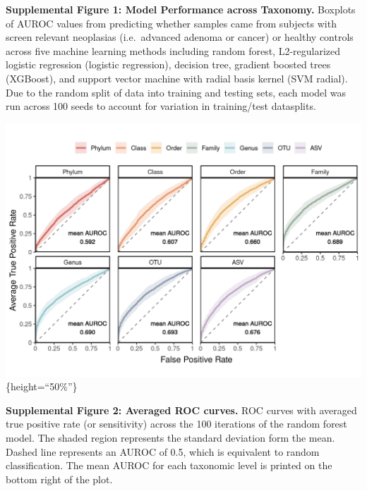 \documentclass[]{article}
\begin{document}
\textbf{Supplemental Figure 1: Model Performance across Taxonomy.}
Boxplots of AUROC values from predicting whether samples came from
subjects with screen relevant neoplasias (i.e.~advanced adenoma or
cancer) or healthy controls across five machine learning methods
including random forest, L2-regularized logistic regression (logistic
regression), decision tree, gradient boosted trees (XGBoost), and
support vector machine with radial basis kernel (SVM radial). Due to the
random split of data into training and testing sets, each model was run
across 100 seeds to account for variation in training/test datasplits.

\newpage

\includegraphics{figure_s2.png}\{height=``50\%''\}

\textbf{Supplemental Figure 2: Averaged ROC curves.} ROC curves with
averaged true positive rate (or sensitivity) across the 100 iterations
of the random forest model. The shaded region represents the standard
deviation form the mean. Dashed line represents an AUROC of 0.5, which
is equivalent to random classification. The mean AUROC for each
taxonomic level is printed on the bottom right of the plot.

\newpage
\end{document}
